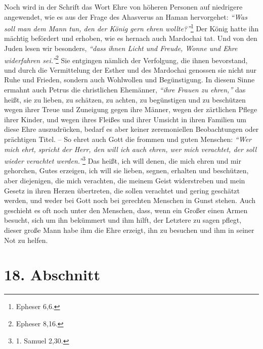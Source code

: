 Noch wird in der Schrift das Wort Ehre von höheren Personen auf niedrigere
angewendet, wie es aus der Frage des Ahasverus
an
Haman hervorgehet:
\textit{"`Was soll man
dem Mann tun, den der König gern ehren wollte?"'}\footnote{Epheser 6,6.}
Der König hatte ihn mächtig befördert und erhoben, wie es hernach auch Mardochai
tat. Und von den Juden lesen wir besonders,
\textit{"`dass ihnen Licht und Freude,
Wonne und Ehre widerfahren sei."'}\footnote{Epheser 8,16.}
Sie entgingen nämlich der
Verfolgung, die ihnen bevorstand, und durch die Vermittelung der
Esther und des
Mardochai genossen sie nicht nur Ruhe und Frieden,
sondern auch Wohlwollen und
Begünstigung. In diesem Sinne ermahnt auch Petrus die christlichen Ehemänner,
\textit{"`ihre Frauen zu ehren,"'} das heißt, sie
zu lieben,
zu schätzen, zu achten, zu
begünstigen und zu beschützen wegen ihrer Treue und Zuneigung gegen ihre Männer,
wegen der zärtlichen Pflege ihrer Kinder, und wegen ihres Fleißes und ihrer
Umsicht in ihren Familien um diese Ehre auszudrücken, bedarf es aber keiner
zeremoniellen Beobachtungen oder prächtigen Titel. -- So ehret auch Gott die
frommen und guten Menschen:
\textit{"`Wer mich ehrt, spricht der Herr, den will ich
auch ehren, wer mich verachtet, der soll wieder verachtet werden."'}\footnote{1.
Samuel 2,30.}
Das heißt, ich will denen, die mich ehren und mir gehorchen, Gutes
erzeigen, ich will sie lieben, segnen, erhalten und beschützen, aber diejenigen,
die mich verachten, die meinem Geist widerstreben und mein Gesetz in ihren
Herzen übertreten, die sollen verachtet und
gering geschätzt werden, und weder
bei Gott noch bei gerechten Menschen in Gunst stehen. Auch geschieht es oft
noch unter den Menschen, dass, wenn ein Großer einen Armen besucht, sich um ihn
bekümmert und ihm hilft, der Letztere zu sagen pflegt, dieser große Mann habe
ihm die Ehre erzeigt, ihn zu besuchen und ihm in seiner Not zu helfen.

\section{18. Abschnitt} \label{kap9_ab18}

